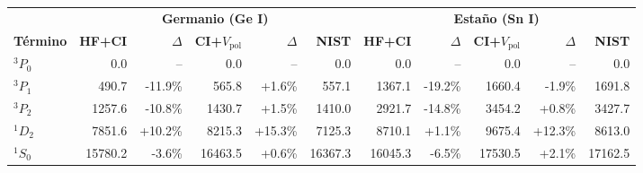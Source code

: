 \small
\begin{tabular}{l|rrrrr|rrrrr}
    \toprule
     & \multicolumn{5}{c|}{\textbf{Germanio (Ge I)}} & \multicolumn{5}{c}{\textbf{Estaño (Sn I)}} \\
    \textbf{Término} & \textbf{HF+CI} & $\Delta$ & \textbf{CI+$V_{\text{pol}}$} & $\Delta$ & \textbf{NIST} & \textbf{HF+CI} & $\Delta$ & \textbf{CI+$V_{\text{pol}}$} & $\Delta$ & \textbf{NIST} \\
    \midrule
    $^3P_0$ & 0.0 & -- & 0.0 & -- & 0.0 & 0.0 & -- & 0.0 & -- & 0.0 \\
    $^3P_1$ & 490.7 & -11.9\% & 565.8 & +1.6\% & 557.1 & 1367.1 & -19.2\% & 1660.4 & -1.9\% & 1691.8 \\
    $^3P_2$ & 1257.6 & -10.8\% & 1430.7 & +1.5\% & 1410.0 & 2921.7 & -14.8\% & 3454.2 & +0.8\% & 3427.7 \\
    $^1D_2$ & 7851.6 & +10.2\% & 8215.3 & +15.3\% & 7125.3 & 8710.1 & +1.1\% & 9675.4 & +12.3\% & 8613.0 \\
    $^1S_0$ & 15780.2 & -3.6\% & 16463.5 & +0.6\% & 16367.3 & 16045.3 & -6.5\% & 17530.5 & +2.1\% & 17162.5 \\
    \bottomrule
\end{tabular}
